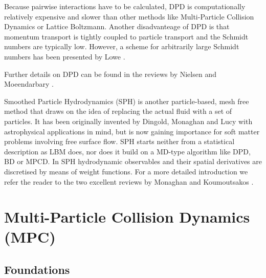 \documentclass[8.5pt,twoside,twocolumn]{article}
\begin{document}
Because pairwise interactions have to be calculated, DPD is computationally relatively expensive and  
slower than other methods like Multi-Particle Collision Dynamics or Lattice Boltzmann.
Another disadvanteage of DPD is that momentum transport is tightly coupled to particle transport and the Schmidt numbers 
are typically low. However, a scheme for arbitrarily large Schmidt numbers has been presented by Lowe \cite{Lowe:2004}.

Further details on DPD can be found in the reviews by Nielsen \cite{Nielsen:2004} and 
Moeendarbary \cite{Moeendarbary:2009, Moeendarbary:2010}.


Smoothed Particle Hydrodynamics (SPH) is another particle-based, mesh free method
that draws on the idea of replacing the actual fluid with a set of particles.
It has been originally invented by Dingold, Monaghan and Lucy
with astrophysical applications in mind, but is now gaining importance for soft matter
problems involving free surface flow.
SPH starts neither from a statistical description as LBM does, nor does it
build on a MD-type algorithm like DPD, BD or MPCD. In SPH hydrodynamic observables 
and their spatial derivatives are discretised by means of 
weight functions. For a more detailed introduction we refer the reader to the two
excellent reviews by Monaghan \cite{Monaghan:2012} and Koumoutsakos \cite{Koumoutsakos:2005}.


\clearpage

\section{Multi-Particle Collision Dynamics (MPC)}

\subsection{Foundations}
\end{document}
